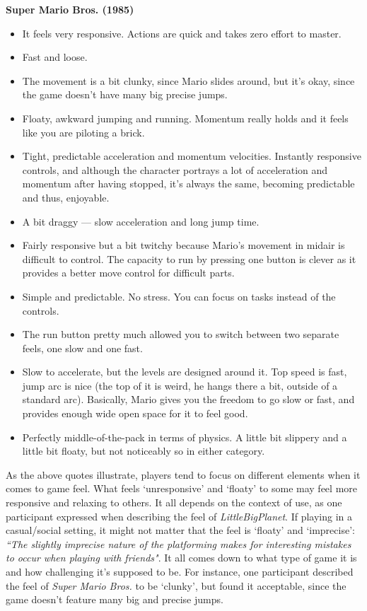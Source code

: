 \textbf{Super Mario Bros. (1985)}
\vspace{-5mm}
\begin{itemize}[noitemsep,nolistsep]
\item It feels very responsive. Actions are quick and takes zero effort to master.
\item Fast and loose.
\item The movement is a bit clunky, since Mario slides around, but it's okay, since the game doesn't have many big precise jumps.
\item Floaty, awkward jumping and running. Momentum really holds and it feels like you are piloting a brick.
\item Tight, predictable acceleration and momentum velocities. Instantly responsive controls, and although the character portrays a lot of acceleration and momentum after having stopped, it's always the same, becoming predictable and thus, enjoyable.
\item A bit draggy --- slow acceleration and long jump time.
\item Fairly responsive but a bit twitchy because Mario's movement in midair is difficult to control. The capacity to run by pressing one button is clever as it provides a better move control for difficult parts.
\item Simple and predictable. No stress. You can focus on tasks instead of the controls.
\item The run button pretty much allowed you to switch between two separate feels, one slow and one fast.
\item Slow to accelerate, but the levels are designed around it. Top speed is fast, jump arc is nice (the top of it is weird, he hangs there a bit, outside of a standard arc). Basically, Mario gives you the freedom to go slow or fast, and provides enough wide open space for it to feel good.
\item Perfectly middle-of-the-pack in terms of physics. A little bit slippery and a little bit floaty, but not noticeably so in either category.
\end{itemize}

As the above quotes illustrate, players tend to focus on different elements when it comes to game feel. What feels `unresponsive' and `floaty' to some may feel more responsive and relaxing to others. It all depends on the context of use, as one participant expressed when describing the feel of \textit{LittleBigPlanet}. If playing in a casual/social setting, it might not matter that the feel is `floaty' and `imprecise': \textit{``The slightly imprecise nature of the platforming makes for interesting mistakes to occur when playing with friends"}. It all comes down to what type of game it is and how challenging it's supposed to be. For instance, one participant described the feel of \textit{Super Mario Bros.} to be `clunky', but found it acceptable, since the game doesn't feature many big and precise jumps.

